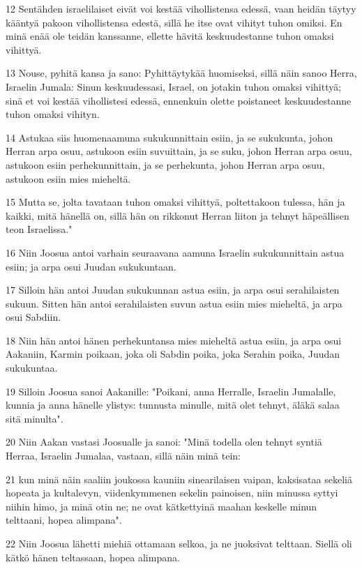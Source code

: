 \par 12 Sentähden israelilaiset eivät voi kestää vihollistensa edessä, vaan heidän täytyy kääntyä pakoon vihollistensa edestä, sillä he itse ovat vihityt tuhon omiksi. En minä enää ole teidän kanssanne, ellette hävitä keskuudestanne tuhon omaksi vihittyä.
\par 13 Nouse, pyhitä kansa ja sano: Pyhittäytykää huomiseksi, sillä näin sanoo Herra, Israelin Jumala: Sinun keskuudessasi, Israel, on jotakin tuhon omaksi vihittyä; sinä et voi kestää vihollistesi edessä, ennenkuin olette poistaneet keskuudestanne tuhon omaksi vihityn.
\par 14 Astukaa siis huomenaamuna sukukunnittain esiin, ja se sukukunta, johon Herran arpa osuu, astukoon esiin suvuittain, ja se suku, johon Herran arpa osuu, astukoon esiin perhekunnittain, ja se perhekunta, johon Herran arpa osuu, astukoon esiin mies mieheltä.
\par 15 Mutta se, jolta tavataan tuhon omaksi vihittyä, poltettakoon tulessa, hän ja kaikki, mitä hänellä on, sillä hän on rikkonut Herran liiton ja tehnyt häpeällisen teon Israelissa."
\par 16 Niin Joosua antoi varhain seuraavana aamuna Israelin sukukunnittain astua esiin; ja arpa osui Juudan sukukuntaan.
\par 17 Silloin hän antoi Juudan sukukunnan astua esiin, ja arpa osui serahilaisten sukuun. Sitten hän antoi serahilaisten suvun astua esiin mies mieheltä, ja arpa osui Sabdiin.
\par 18 Niin hän antoi hänen perhekuntansa mies mieheltä astua esiin, ja arpa osui Aakaniin, Karmin poikaan, joka oli Sabdin poika, joka Serahin poika, Juudan sukukuntaa.
\par 19 Silloin Joosua sanoi Aakanille: "Poikani, anna Herralle, Israelin Jumalalle, kunnia ja anna hänelle ylistys: tunnusta minulle, mitä olet tehnyt, äläkä salaa sitä minulta".
\par 20 Niin Aakan vastasi Joosualle ja sanoi: "Minä todella olen tehnyt syntiä Herraa, Israelin Jumalaa, vastaan, sillä näin minä tein:
\par 21 kun minä näin saaliin joukossa kauniin sinearilaisen vaipan, kaksisataa sekeliä hopeata ja kultalevyn, viidenkymmenen sekelin painoisen, niin minussa syttyi niihin himo, ja minä otin ne; ne ovat kätkettyinä maahan keskelle minun telttaani, hopea alimpana".
\par 22 Niin Joosua lähetti miehiä ottamaan selkoa, ja ne juoksivat telttaan. Siellä oli kätkö hänen teltassaan, hopea alimpana.
